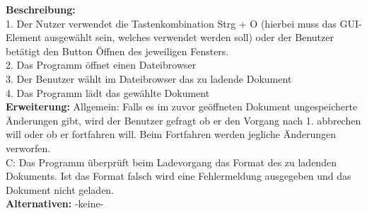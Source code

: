 \documentclass[a4paper]{scrreprt}
\begin{document}
\textbf{Beschreibung:} \\
1. Der Nutzer verwendet die Tastenkombination Strg + O (hierbei muss das GUI-Element ausgewählt sein, welches verwendet werden soll) oder der Benutzer betätigt den Button Öffnen des jeweiligen Fensters. \\
2. Das Programm öffnet einen Dateibrowser\\
3. Der Benutzer wählt im Dateibrowser das zu ladende Dokument \\
4. Das Programm lädt das gewählte Dokument \\
\textbf {Erweiterung:} Allgemein: Falls es im zuvor geöffneten Dokument ungespeicherte Änderungen gibt, wird der Benutzer gefragt ob er den Vorgang nach 1. abbrechen will oder ob er fortfahren will. Beim Fortfahren werden jegliche Änderungen verworfen. \\
C: Das Programm überprüft beim Ladevorgang das Format des zu ladenden Dokuments. Ist das Format falsch wird eine Fehlermeldung ausgegeben und das Dokument nicht geladen. \\
\textbf {Alternativen:} -keine- \\ \\
\end{document}
